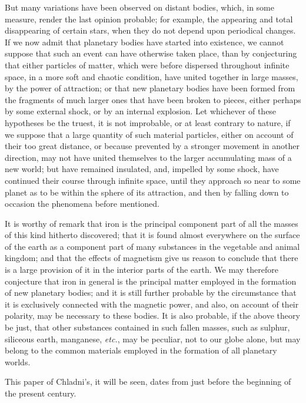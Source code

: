\documentclass[a4paper, 12pt, oneside, polutonikogreek, english]{article}
\begin{document}
But many variations have been observed on distant bodies, which, in some measure, render the last opinion probable; for example, the appearing and total disappearing of certain stars, when they do not depend upon periodical changes. If we now admit that planetary bodies have started into existence, we cannot suppose that such an event can have otherwise taken place, than by conjecturing that either particles of matter, which were before dispersed throughout infinite space, in a more soft and chaotic condition, have united together in large masses, by the power of attraction; or that new planetary bodies have been formed from the fragments of much larger ones that have been broken to pieces, either perhaps by some external shock, or by an internal explosion. Let whichever of these hypotheses be the truest, it is not improbable, or at least contrary to nature, if we suppose that a large quantity of such material particles, either on account of their too great distance, or because prevented by a stronger movement in another direction, may not have united themselves to the larger accumulating mass of a new world; but have remained insulated, and, impelled by some shock, have continued their course through infinite space, until they approach so near to some planet as to be within the sphere of its attraction, and then by falling down to occasion the phenomena before mentioned.

It is worthy of remark that iron is the principal component part of all the masses of this kind hitherto discovered; that it is found almost everywhere on the surface of the earth as a component part of many substances in the vegetable and animal kingdom; and that the effects of magnetism give us reason to conclude that there is a large provision of it in the interior parts of the earth. We may therefore conjecture that iron in general is the principal matter employed in the formation of new planetary bodies; and it is still further probable by the circumstance that it is exclusively connected with the magnetic power, and also, on account of their polarity, may be necessary to these bodies. It is also probable, if the above theory be just, that other substances contained in such fallen masses, such as sulphur, siliceous earth, manganese, \emph{etc.}, may be peculiar, not to our globe alone, but may belong to the common materials employed in the formation of all planetary worlds.

This paper of Chladni's, it will be seen, dates from just before the beginning of the present century.
\end{document}
